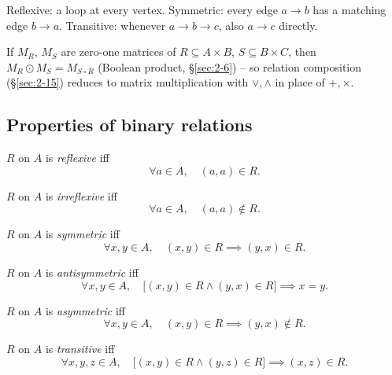 \documentclass[11pt]{article}
\begin{document}
\begin{note}
Reflexive: a loop at every vertex. Symmetric: every edge $a\to b$ has a matching edge $b\to a$. Transitive: whenever $a\to b\to c$, also $a\to c$ directly.
\end{note}

\begin{note}
If $M_R$, $M_S$ are zero-one matrices of $R\subseteq A\times B$, $S\subseteq B\times C$, then $M_R\odot M_S = M_{S\circ R}$ (Boolean product, \S\ref{sec:2-6}) -- so relation composition (\S\ref{sec:2-15}) reduces to matrix multiplication with $\vee,\wedge$ in place of $+,\times$.
\end{note}

\subsection{Properties of binary relations}
\label{sec:2-14}

\begin{definition}[Reflexive]
$R$ on $A$ is \emph{reflexive} iff
\[
\forall a \in A,\quad (a,a) \in R.
\]
\end{definition}

\begin{definition}[Irreflexive]
$R$ on $A$ is \emph{irreflexive} iff
\[
\forall a \in A,\quad (a,a) \notin R.
\]
\end{definition}

\begin{definition}[Symmetric]
$R$ on $A$ is \emph{symmetric} iff
\[
\forall x,y \in A,\quad (x,y) \in R \implies (y,x) \in R.
\]
\end{definition}

\begin{definition}[Antisymmetric]
$R$ on $A$ is \emph{antisymmetric} iff
\[
\forall x,y \in A,\quad \big[(x,y) \in R \wedge (y,x) \in R\big] \implies x = y.
\]
\end{definition}

\begin{definition}[Asymmetric]
$R$ on $A$ is \emph{asymmetric} iff
\[
\forall x,y \in A,\quad (x,y) \in R \implies (y,x) \notin R.
\]
\end{definition}

\begin{definition}[Transitive]
$R$ on $A$ is \emph{transitive} iff
\[
\forall x,y,z \in A,\quad \big[(x,y) \in R \wedge (y,z) \in R\big] \implies (x,z) \in R.
\]
\end{definition}
\end{document}

